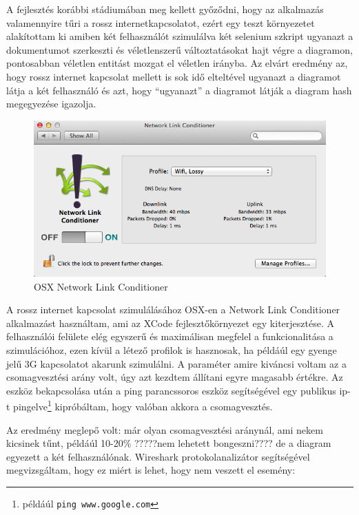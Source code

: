 A fejlesztés korábbi stádiumában meg kellett győződni, hogy az alkalmazás valamennyire tűri a rossz internetkapcsolatot, ezért egy teszt környezetet alakítottam ki amiben két felhasználót szimulálva két selenium szkript ugyanazt a dokumentumot szerkeszti és véletlenszerű változtatásokat hajt végre a diagramon, pontosabban véletlen entitást mozgat el véletlen irányba. Az elvárt eredmény az, hogy rossz internet kapcsolat mellett is sok idő elteltével ugyanazt a diagramot látja a két felhasználó és azt, hogy ``ugyanazt'' a diagramot látják a diagram hash megegyezése igazolja.
 

\begin{figure}[!ht]
\centering
\includegraphics[width=15cm,keepaspectratio]{figures/nlc.png}
\caption{OSX Network Link Conditioner}
\label{fig:nlc}
\end{figure}


A rossz internet kapcsolat szimulálásához OSX-en a Network Link Conditioner alkalmazást használtam, ami az XCode fejlesztőkörnyezet egy kiterjesztése. A felhasználói felülete elég egyszerű és maximálisan megfelel a funkcionalitása a szimulációhoz, ezen kívül a létező profilok is hasznosak, ha példáúl egy gyenge jelű 3G kapcsolatot akarunk szimulálni. A paraméter amire kiváncsi voltam az a csomagvesztési arány volt, úgy azt kezdtem állítani egyre magasabb értékre. Az eszköz bekapcsolása után a ping parancssoros eszköz segítségével egy publikus ip-t pingelve\footnote{példáúl \lstinline{ping www.google.com}} kipróbáltam, hogy valóban akkora a csomagvesztés.

Az eredmény meglepő volt: már olyan csomagvesztési aránynál, ami nekem kicsinek tűnt, példáúl 10-20\% ?????nem lehetett bongeszni????
de a diagram egyezett a két felhasználónak. Wireshark protokolanalizátor segítségével megvizsgáltam, hogy ez miért is lehet, hogy nem veszett el esemény:


